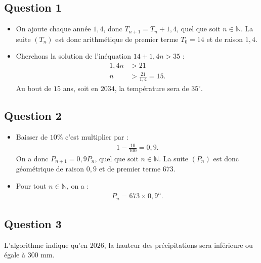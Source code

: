 \subsection*{Question 1}
	
	\begin{itemize}
		\item[a)] On ajoute chaque année $1,4$, donc $T_{n+1} = T_n + 1,4$, quel que soit $n \in \mathbb{N}$. La suite $(T_n)$ est donc arithmétique de premier terme $T_0 = 14$ et de raison $1,4$.
		\item[b)] Cherchons la solution de l'inéquation $14 + 1,4n > 35$ :
		\begin{align*}
			1,4n &> 21 \\
			n &> \frac{21}{1,4} = 15.
		\end{align*}
		Au bout de $15$ ans, soit en $2034$, la température sera de $35^\circ$.
	\end{itemize}
	
	\subsection*{Question 2}
	
	\begin{itemize}
		\item[a)] Baisser de $10\%$ c'est multiplier par :
		\begin{align*}
			1 - \frac{10}{100} = 0,9.
		\end{align*}
		On a donc $P_{n+1} = 0,9 P_n$, quel que soit $n \in \mathbb{N}$. La suite $(P_n)$ est donc géométrique de raison $0,9$ et de premier terme $673$.
		\item[b)] Pour tout $n \in \mathbb{N}$, on a :
		\begin{align*}
			P_n = 673 \times 0,9^n.
		\end{align*}
	\end{itemize}
	
	\subsection*{Question 3}
	
	L'algorithme indique qu'en $2026$, la hauteur des précipitations sera inférieure ou égale à $300$ mm.
